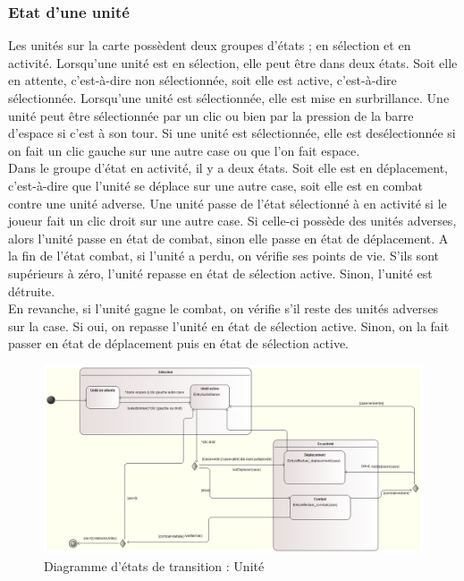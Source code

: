 \documentclass[a4paper,11pt]{article}
\begin{document}
\subsubsection{Etat d'une unité}
Les unités sur la carte possèdent deux groupes d'états ; en sélection et en activité. Lorsqu'une unité est en sélection, elle peut être dans deux états. Soit elle en attente, c'est-à-dire non sélectionnée, soit elle est active, c'est-à-dire sélectionnée. Lorsqu'une unité est sélectionnée, elle est mise en surbrillance. Une unité peut être sélectionnée par un clic ou bien par la pression de la barre d'espace si c'est à son tour. Si une unité est sélectionnée, elle est desélectionnée si on fait un clic gauche sur une autre case ou que l'on fait espace.\\
Dans le groupe d'état en activité, il y a deux états. Soit elle est en déplacement, c'est-à-dire que l'unité se déplace sur une autre case, soit elle est en combat contre une unité adverse. 
Une unité passe de l'état sélectionné à en activité si le joueur fait un clic droit sur une autre case. Si celle-ci possède des unités adverses, alors l'unité passe en état de combat, sinon elle passe en état de déplacement. A la fin de l'état combat, si l'unité a perdu, on vérifie ses points de vie. S'ils sont supérieurs à zéro, l'unité repasse en état de sélection active. Sinon, l'unité est détruite.\\
En revanche, si l'unité gagne le combat, on vérifie s'il reste des unités adverses sur la case. Si oui, on repasse l'unité en état de sélection active. Sinon, on la fait passer en état de déplacement puis en état de sélection active. 
\begin{figure}[H]
	\centering
	\includegraphics[width=\textwidth]{fig/diagramme_etat_transition_unite_modelio}
	\caption{Diagramme d'états de transition : Unité}
	\label{det:e}
\end{figure} 
\end{document}
